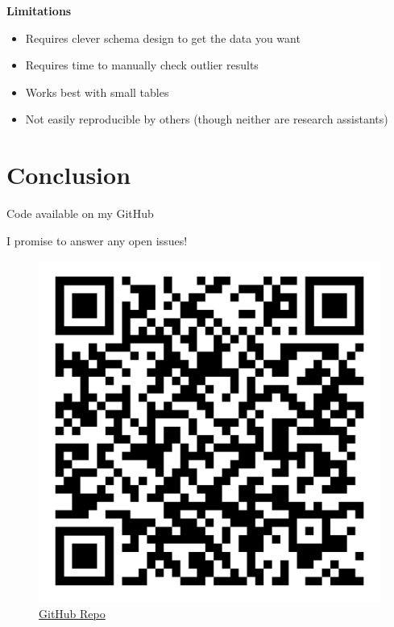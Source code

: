 \documentclass[
  letterpaper,
  DIV=11,
  numbers=noendperiod]{scrartcl}
\providecommand{\tightlist}{%
  \setlength{\itemsep}{0pt}\setlength{\parskip}{0pt}}\usepackage{longtable,booktabs,array}
\begin{document}
\textbf{Limitations}

\begin{itemize}
\tightlist
\item
  Requires clever schema design to get the data you want
\item
  Requires time to manually check outlier results
\item
  Works best with small tables
\item
  Not easily reproducible by others (though neither are research
  assistants)
\end{itemize}

\hypertarget{sec-conclusion}{%
\section{Conclusion}\label{sec-conclusion}}

Code available on my GitHub

I promise to answer any open issues!

\begin{figure}

{\centering \includegraphics{assets/qr-code.png}

}

\caption{\href{https://github.com/j-jayes/swedish-company-reports-data-extraction}{GitHub
Repo}}

\end{figure}
\end{document}
